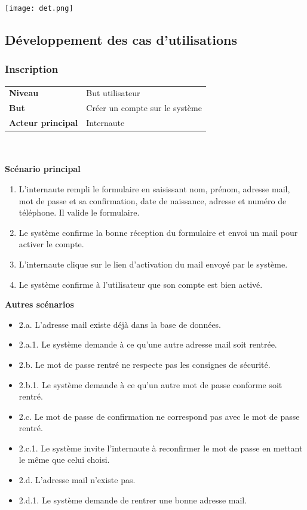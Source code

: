 \documentclass[11pt,a4paper]{article}
\begin{document}
\vspace{4cm}

\texttt{[image: det.png]}

\newpage

\subsection{Développement des cas d’utilisations}


\subsubsection{Inscription}

\begin{tabular}{ll}
    \textbf{Niveau} & But utilisateur \\
    \textbf{But} & Créer un compte sur le système \\
    \textbf{Acteur principal} & Internaute \newline
\end{tabular}
~\\
~\\


\textbf{Scénario principal}

\begin{enumerate}
    \item L’internaute rempli le formulaire en saisissant nom, prénom, adresse mail, mot de passe et sa confirmation, date de naissance, adresse et numéro de téléphone. Il valide le formulaire.
    \item Le système confirme la bonne réception du formulaire et envoi un mail pour activer le compte.
    \item L’internaute clique sur le lien d’activation du mail envoyé par le système.
    \item Le système confirme à l’utilisateur que son compte est bien activé.
\end{enumerate}


\textbf{Autres scénarios}

\begin{itemize}[label=]
    \item 2.a.  L’adresse mail existe déjà dans la base de données.
    \item 2.a.1.    Le système demande à ce qu’une autre adresse mail soit rentrée.
    \item 2.b.  Le mot de passe rentré ne respecte pas les consignes de sécurité.
    \item 2.b.1.    Le système demande à ce qu’un autre mot de passe conforme soit rentré.
    \item 2.c.  Le mot de passe de confirmation ne correspond pas avec le mot de passe rentré.
    \item 2.c.1.    Le système invite l’internaute à reconfirmer le mot de passe en mettant le même que celui choisi.
    \item 2.d.  L’adresse mail n’existe pas.
    \item 2.d.1.    Le système demande de rentrer une bonne adresse mail.
\end{itemize}
\end{document}
